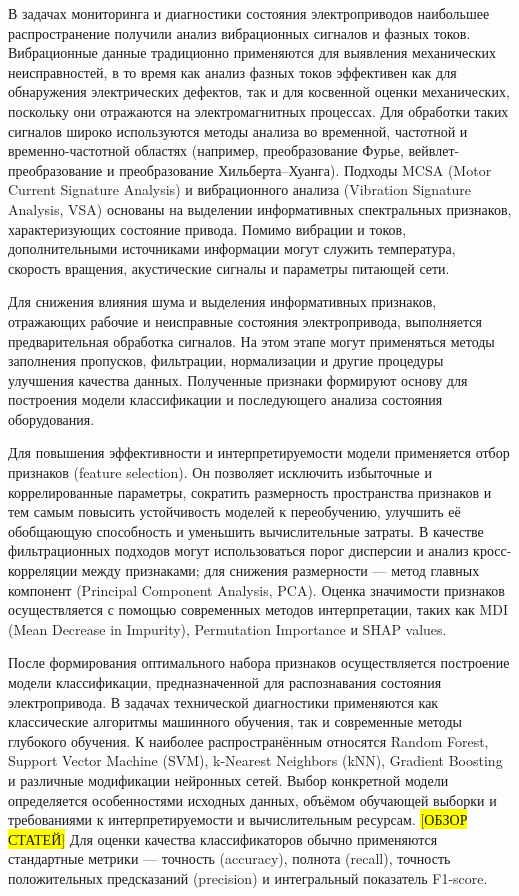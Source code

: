 В задачах мониторинга и диагностики состояния электроприводов наибольшее распространение получили анализ вибрационных сигналов и фазных токов. Вибрационные данные традиционно применяются для выявления механических неисправностей, в то время как анализ фазных токов эффективен как для обнаружения электрических дефектов, так и для косвенной оценки механических, поскольку они отражаются на электромагнитных процессах. Для обработки таких сигналов широко используются методы анализа во временной, частотной и временно-частотной областях (например, преобразование Фурье, вейвлет-преобразование и преобразование Хильберта–Хуанга). Подходы MCSA (Motor Current Signature Analysis) и вибрационного анализа (Vibration Signature Analysis, VSA) основаны на выделении информативных спектральных признаков, характеризующих состояние привода. Помимо вибрации и токов, дополнительными источниками информации могут служить температура, скорость вращения, акустические сигналы и параметры питающей сети.

Для снижения влияния шума и выделения информативных признаков, отражающих рабочие и неисправные состояния электропривода, выполняется предварительная обработка сигналов. На этом этапе могут применяться методы заполнения пропусков, фильтрации, нормализации и другие процедуры улучшения качества данных. Полученные признаки формируют основу для построения модели классификации и последующего анализа состояния оборудования.

Для повышения эффективности и интерпретируемости модели применяется отбор признаков (feature selection). Он позволяет исключить избыточные и коррелированные параметры, сократить размерность пространства признаков и тем самым повысить устойчивость моделей к переобучению, улучшить её обобщающую способность и уменьшить вычислительные затраты. В качестве фильтрационных подходов могут использоваться порог дисперсии и анализ кросс-корреляции между признаками; для снижения размерности — метод главных компонент (Principal Component Analysis, PCA). Оценка значимости признаков осуществляется с помощью современных методов интерпретации, таких как MDI (Mean Decrease in Impurity), Permutation Importance и SHAP values.

После формирования оптимального набора признаков осуществляется построение модели классификации, предназначенной для распознавания состояния электропривода. В задачах технической диагностики применяются как классические алгоритмы машинного обучения, так и современные методы глубокого обучения. К наиболее распространённым относятся Random Forest, Support Vector Machine (SVM), k-Nearest Neighbors (kNN), Gradient Boosting и различные модификации нейронных сетей. Выбор конкретной модели определяется особенностями исходных данных, объёмом обучающей выборки и требованиями к интерпретируемости и вычислительным ресурсам. \colorbox{yellow}{[ОБЗОР СТАТЕЙ]} Для оценки качества классификаторов обычно применяются стандартные метрики — точность (accuracy), полнота (recall), точность положительных предсказаний (precision) и интегральный показатель F1-score.

